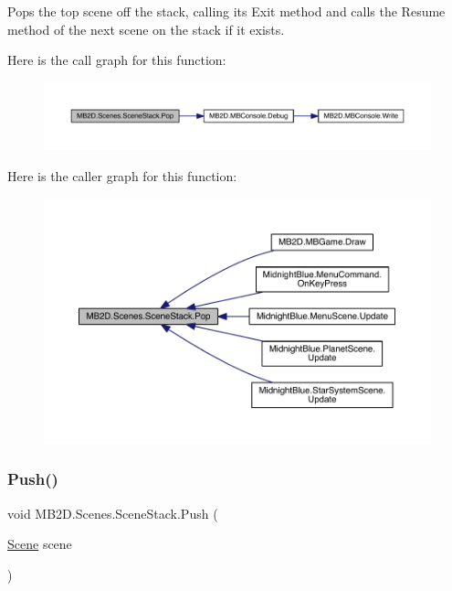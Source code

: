 Pops the top scene off the stack, calling its Exit method and calls the Resume method of the next scene on the stack if it exists. 

Here is the call graph for this function\+:\nopagebreak
\begin{figure}[H]
\begin{center}
\leavevmode
\includegraphics[width=350pt]{class_m_b2_d_1_1_scenes_1_1_scene_stack_a134c3aff1731fb86116b78cac7112464_cgraph}
\end{center}
\end{figure}
Here is the caller graph for this function\+:\nopagebreak
\begin{figure}[H]
\begin{center}
\leavevmode
\includegraphics[width=350pt]{class_m_b2_d_1_1_scenes_1_1_scene_stack_a134c3aff1731fb86116b78cac7112464_icgraph}
\end{center}
\end{figure}
\hypertarget{class_m_b2_d_1_1_scenes_1_1_scene_stack_a22760622453ac16621534bc324ec039f}{}\label{class_m_b2_d_1_1_scenes_1_1_scene_stack_a22760622453ac16621534bc324ec039f} 
\subsubsection{\texorpdfstring{Push()}{Push()}}
{\footnotesize\ttfamily void M\+B2\+D.\+Scenes.\+Scene\+Stack.\+Push (\begin{DoxyParamCaption}\item[{\hyperlink{class_m_b2_d_1_1_scenes_1_1_scene}{Scene}}]{scene }\end{DoxyParamCaption})\hspace{0.3cm}{\ttfamily [inline]}}



